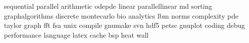 sequential
parallel
arithmetic
odepde
linear
parallellinear
md
sorting
graphalgorithms
discrete
montecarlo
bio
analytics
lbm
norms
complexity
pde
taylor
graph
fft
fsa
unix
compile
gnumake
svn
hdf5
petsc
gnuplot
coding
debug
performance
language
latex
cache
bsp
heat
wall
